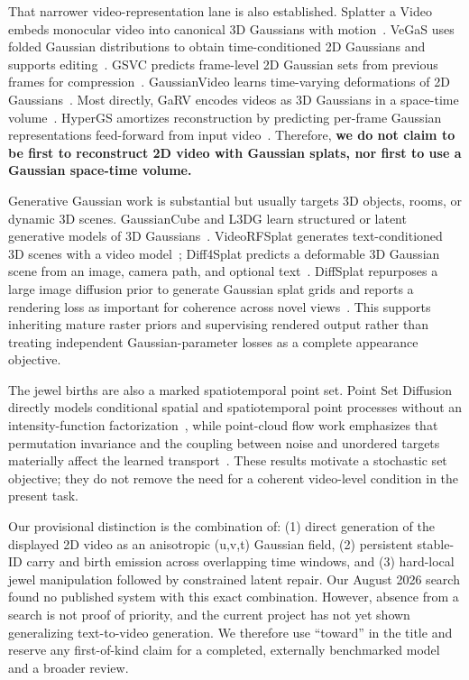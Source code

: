 \documentclass[10pt]{article}
\newcommand{\uvt}{(u,v,t)}
\begin{document}
That narrower video-representation lane is also established. Splatter a Video embeds monocular
video into canonical 3D Gaussians with motion~\cite{sun2024splatter}. VeGaS uses folded Gaussian
distributions to obtain time-conditioned 2D Gaussians and supports editing~\cite{smolak2024vegas}.
GSVC predicts frame-level 2D Gaussian sets from previous frames for compression~\cite{wang2025gsvc}.
GaussianVideo learns time-varying deformations of 2D Gaussians~\cite{lee2025gaussianvideo}.
Most directly, GaRV encodes videos as 3D Gaussians in a space-time volume~\cite{shah2026garv}.
HyperGS amortizes reconstruction by predicting per-frame Gaussian representations feed-forward from
input video~\cite{zohra2026hypergs}. Therefore, \textbf{we do not claim to be first to reconstruct
2D video with Gaussian splats, nor first to use a Gaussian space-time volume.}

Generative Gaussian work is substantial but usually targets 3D objects, rooms, or dynamic 3D
scenes. GaussianCube and L3DG learn structured or latent generative models of 3D
Gaussians~\cite{zhang2024gaussiancube,roessle2024l3dg}. VideoRFSplat generates text-conditioned 3D
scenes with a video model~\cite{go2025videorfsplat}; Diff4Splat predicts a deformable 3D Gaussian
scene from an image, camera path, and optional text~\cite{pan2026diff4splat}. DiffSplat repurposes a
large image diffusion prior to generate Gaussian splat grids and reports a rendering loss as
important for coherence across novel views~\cite{lin2025diffsplat}. This supports inheriting mature
raster priors and supervising rendered output rather than treating independent Gaussian-parameter
losses as a complete appearance objective.

The jewel births are also a marked spatiotemporal point set. Point Set Diffusion directly models
conditional spatial and spatiotemporal point processes without an intensity-function
factorization~\cite{ludke2024pointset}, while point-cloud flow work emphasizes that permutation
invariance and the coupling between noise and unordered targets materially affect the learned
transport~\cite{hui2025notsoptimal}. These results motivate a stochastic set objective; they do not
remove the need for a coherent video-level condition in the present task.

Our provisional distinction is the combination of: (1) direct generation of the displayed 2D
video as an anisotropic \uvt{} Gaussian field, (2) persistent stable-ID carry and birth emission
across overlapping time windows, and (3) hard-local jewel manipulation followed by constrained
latent repair. Our August 2026 search found no published system with this exact combination.
However, absence from a search is not proof of priority, and the current project has not yet shown
generalizing text-to-video generation. We therefore use ``toward'' in the title and reserve any
first-of-kind claim for a completed, externally benchmarked model and a broader review.
\end{document}
